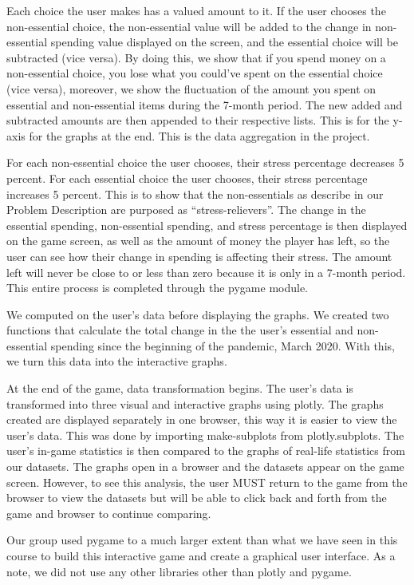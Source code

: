\documentclass[fontsize=11pt]{article}
\begin{document}
    Each choice the user makes has a valued amount to it. If the user chooses the non-essential choice, the non-essential value will be added to the change in non-essential spending value displayed on the screen, and the essential choice will be subtracted (vice versa). By doing this, we show that if you spend money on a non-essential choice, you lose what you could’ve spent on the essential choice (vice versa), moreover, we show the fluctuation of the amount you spent on essential and non-essential items during the 7-month period. The new added and subtracted amounts are then appended to their respective lists. This is for the y-axis for the graphs at the end. This is the data aggregation in the project.

    For each non-essential choice the user chooses, their stress percentage decreases 5 percent. For each essential choice the user chooses, their stress percentage increases 5 percent. This is to show that the non-essentials as describe in our Problem Description are purposed as “stress-relievers”. The change in the essential spending, non-essential spending, and stress percentage is then displayed on the game screen, as well as the amount of money the player has left, so the user can see how their change in spending is affecting their stress. The amount left will never be close to or less than zero because it is only in a 7-month period. This entire process is completed through the pygame module.

    We computed on the user's data before displaying the graphs. We created two functions that calculate the total change in the the user's essential and non-essential spending since the beginning of the pandemic, March 2020. With this, we turn this data into the interactive graphs.

    At the end of the game, data transformation begins. The user’s data is transformed into three visual and interactive graphs using plotly. The graphs created are displayed separately in one browser, this way it is easier to view the user’s data. This was done by importing make-subplots from plotly.subplots. The user’s in-game statistics is then compared to the graphs of real-life statistics from our datasets. The graphs open in a browser and the datasets appear on the game screen. However, to see this analysis, the user MUST return to the game from the browser to view the datasets but will be able to click back and forth from the game and browser to continue comparing.

    Our group used pygame to a much larger extent than what we have seen in this course to build this interactive game and create a graphical user interface. As a note, we did not use any other libraries other than plotly and pygame.
\end{document}
